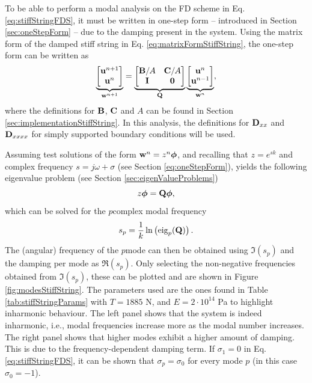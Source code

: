 {To be able to perform a modal analysis on the FD scheme in Eq. \eqref{eq:stiffStringFDS}, it must be written in one-step form -- introduced in Section \ref{sec:oneStepForm} -- due to the damping present in the system. Using the matrix form of the damped stiff string in Eq. \eqref{eq:matrixFormStiffString}, the one-step form can be written as
\begin{equation}\label{eq:oneStepFormStiffSTring}
    \underbrace{\begin{bmatrix}
        \mathbf{u}^{n+1}\\
        \mathbf{u}^n
    \end{bmatrix}}_{\mathbf{w}^{n+1}} = 
    \underbrace{\begin{bmatrix}
        \mathbf{B}/A & \mathbf{C}/A\\
        \mathbf{I} & \mathbf{0}
    \end{bmatrix}}_{\mathbf{Q}}
    \underbrace{\begin{bmatrix}
        \mathbf{u}^n\\
        \mathbf{u}^{n-1}
    \end{bmatrix}}_{\mathbf{w}^n},
\end{equation}
where the definitions for $\mathbf{B}$, $\mathbf{C}$ and $A$ can be found in Section \ref{sec:implementationStiffString}. In this analysis, the definitions for $\mathbf{D}_{xx}$ and $\mathbf{D}_{xxxx}$ for simply supported boundary conditions will be used.

Assuming test solutions of the form $\mathbf{w}^n = z^n\boldsymbol{\phi}$, and recalling that $z=e^{sk}$ and complex frequency $s = j\omega + \sigma$ (see Section \ref{eq:oneStepForm}), yields the following eigenvalue problem (see Section \ref{sec:eigenValueProblems})
\begin{equation}
    z\boldsymbol{\phi} = \mathbf{Q} \boldsymbol{\phi},
\end{equation}
which can be solved for the $p$\th complex modal frequency
\begin{equation}
    s_p = \frac{1}{k}\ln \left(\text{eig}_p(\mathbf{Q})\right).
\end{equation}
The (angular) frequency of the $p$\th mode can then be obtained using $\mathfrak{I}(s_p)$ and the damping per mode as $\mathfrak{R}(s_p)$. Only selecting the non-negative frequencies obtained from $\mathfrak{I}(s_p)$, these can be plotted and are shown in Figure \ref{fig:modesStiffString}. The parameters used are the ones found in Table \ref{tab:stiffStringParams} with $T = 1885$ N, and $E = 2\cdot 10^{14}$ Pa to highlight inharmonic behaviour. The left panel shows that the system is indeed inharmonic, i.e., modal frequencies increase more as the modal number increases. The right panel shows that higher modes exhibit a higher amount of damping. This is due to the frequency-dependent damping term. If $\sigma_1 = 0$ in Eq. \eqref{eq:stiffStringFDS}, it can be shown that $\sigma_p = \sigma_0$ for every mode $p$ (in this case $\sigma_0 = -1$).

}
